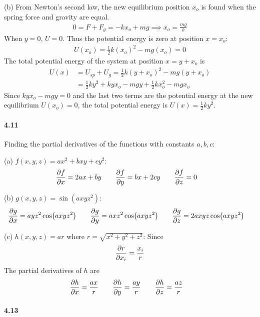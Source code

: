 \documentclass[../problems.tex]{subfiles}
\begin{document}
(b) From Newton's second law, the new equilibrium position $x_o$ is found when the spring force and
gravity are equal.
\begin{align*}
    0 = F + F_{g} = -kx_o + m g \implies x_o = \frac{mg}{k}
\end{align*}
When $y = 0$,  $U = 0$. Thus the potential energy is zero at position $x = x_o$:
\begin{align*}
    U(x_o) = \frac{1}{2} k(x_o)^2 - mg(x_o) = 0
\end{align*}
The total potential energy of the system at position $x = y + x_o$ is
\begin{align*}
    U(x) &= U_{sp} + U_{g} = \frac{1}{2} k(y+x_o)^2 - mg(y+x_o) \\
    &= \frac{1}{2} ky^2 + kyx_o - mgy + \frac{1}{2} kx_o^2 - mgx_o
\end{align*}
Since $kyx_o - mgy = 0$ and the last two terms are the potential energy at the new equilibrium
$U(x_o) = 0$, the total potential energy is $U(x) = \frac{1}{2} ky^2$.

\paragraph{4.11}
Finding the partial derivatives of the functions with constants $a,b,c$:

(a) $f(x,y,z) = ax^2 + bxy + cy^2$:
\begin{align*}
    \pdv{f}{x} &= 2ax + by \qquad \pdv{f}{y} = bx + 2cy \qquad \pdv{f}{z} = 0
\end{align*}

(b) $g(x,y,z) = \sin(axyz^2)$:
\begin{align*}
    \pdv{g}{x} &= ayz^2 \cos(axyz^2) \qquad \pdv{g}{y} = axz^2 \cos(axyz^2) 
    \qquad \pdv{g}{z} = 2axyz \cos(axyz^2)
\end{align*}

(c) $h(x,y,z) = ar$ where $r = \sqrt{x^2 + y^2 + z^2}$:
Since 
\begin{equation*}
    \pdv{r}{x_i} = \frac{x_i}{r}
\end{equation*}
The partial derivatives of $h$ are
\begin{align*}
    \pdv{h}{x} &= \frac{ax}{r} \qquad \pdv{h}{y} = \frac{ay}{r} \qquad \pdv{h}{z} = \frac{az}{r}
\end{align*}

\paragraph{4.13}
\end{document}
